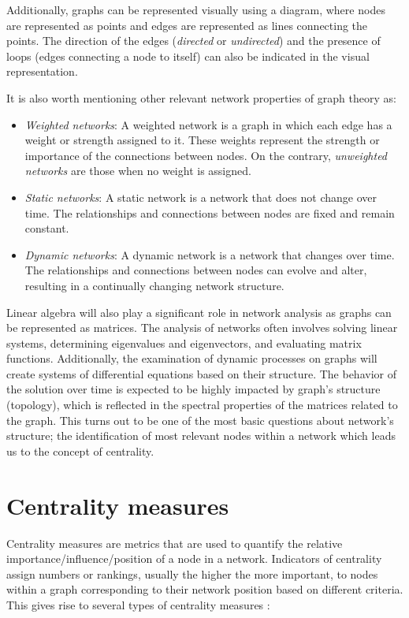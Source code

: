Additionally, graphs can be represented visually using a diagram, where nodes are represented as points and edges are represented as lines connecting the points. The direction of the edges (\textit{directed} or \textit{undirected}) and the presence of loops (edges connecting a node to itself) can also be indicated in the visual representation.

It is also worth mentioning other relevant network properties of graph theory as:

\begin{itemize}
  \item \textit{Weighted networks}: A weighted network is a graph in which each edge has a weight or strength assigned to it. These weights represent the strength or importance of the connections between nodes. On the contrary, \textit{unweighted networks} are those when no weight is assigned.
  \item \textit{Static networks}: A static network is a network that does not change over time. The relationships and connections between nodes are fixed and remain constant. 
  \item \textit{Dynamic networks}: A dynamic network is a network that changes over time. The relationships and connections between nodes can evolve and alter, resulting in a continually changing network structure.
\end{itemize}

Linear algebra will also play a significant role in network analysis as graphs can be represented as matrices. The analysis of networks often involves solving linear systems, determining eigenvalues and eigenvectors, and evaluating matrix functions. Additionally, the examination of dynamic processes on graphs will create systems of differential equations based on their structure. The behavior of the solution over time is expected to be highly impacted by graph's structure (topology), which is reflected in the spectral properties of the matrices related to the graph. This turns out to be one of the most basic questions about network's structure; the identification of most relevant nodes within a network which leads us to the concept of centrality.

\section{Centrality measures}
\label{sec:centra}
 Centrality measures are metrics that are used to quantify the relative importance/influence/position of a node in a network. Indicators of centrality assign numbers or rankings, usually the higher the more important, to nodes within a graph corresponding to their network position based on different criteria. This gives rise to several types of centrality measures \cite{newman2018networks}:

